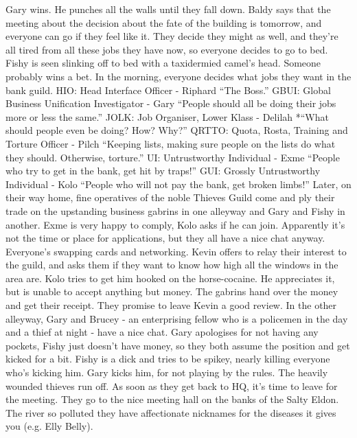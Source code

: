 Gary wins. He punches all the walls until they fall down.\medskip
Baldy says that the meeting about the decision about the fate of the building is tomorrow, and everyone can go if they feel like it.\medskip
They decide they might as well, and they’re all tired from all these jobs they have now, so everyone decides to go to bed. Fishy is seen slinking off to bed with a taxidermied camel’s head. Someone probably wins a bet.\medskip
In the morning, everyone decides what jobs they want in the bank guild.\medskip
HIO: Head Interface Officer - Riphard “The Boss.”\medskip
GBUI: Global Business Unification Investigator - Gary “People should all be doing their jobs more or less the same.”\medskip
JOLK: Job Organiser, Lower Klass - Delilah *“What should people even be doing? How? Why?”\medskip
QRTTO: Quota, Rosta, Training and Torture Officer - Pilch “Keeping lists, making sure people on the lists do what they should. Otherwise, torture.”\medskip
UI: Untrustworthy Individual - Exme “People who try to get in the bank, get hit by traps!”\medskip
GUI: Grossly Untrustworthy Individual - Kolo “People who will not pay the bank, get broken limbs!”\medskip
Later, on their way home, fine operatives of the noble Thieves Guild come and ply their trade on the upstanding business gabrins in one alleyway and Gary and Fishy in another.\medskip
Exme is very happy to comply, Kolo asks if he can join.\medskip
Apparently it’s not the time or place for applications, but they all have a nice chat anyway. Everyone’s swapping cards and networking. Kevin offers to relay their interest to the guild, and asks them if they want to know how high all the windows in the area are.\medskip
Kolo tries to get him hooked on the horse-cocaine. He appreciates it, but is unable to accept anything but money.\medskip
The gabrins hand over the money and get their receipt. They promise to leave Kevin a good review.\medskip
In the other alleyway, Gary and Brucey - an enterprising fellow who is a policemen in the day and a thief at night - have a nice chat.\medskip
Gary apologises for not having any pockets, Fishy just doesn’t have money, so they both assume the position and get kicked for a bit.\medskip
Fishy is a dick and tries to be spikey, nearly killing everyone who’s kicking him. Gary kicks him, for not playing by the rules. The heavily wounded thieves run off.\medskip
As soon as they get back to HQ, it’s time to leave for the meeting.\medskip
They go to the nice meeting hall on the banks of the Salty Eldon. The river so polluted they have affectionate nicknames for the diseases it gives you (e.g. Elly Belly).\medskip
